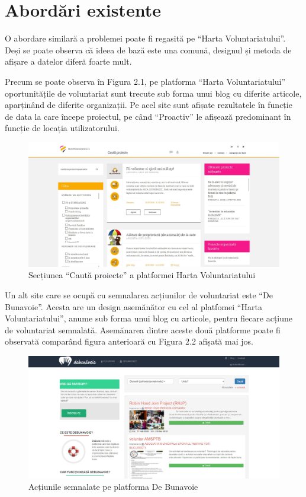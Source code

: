 \documentclass[12pt,a4paper]{report}
\begin{document}
\chapter{Abordări existente}
\par
O abordare similară a problemei poate fi regasită pe “Harta Voluntariatului”\cite{hv}. Deși se poate observa că ideea de bază este una comună, designul și metoda de afișare a datelor diferă foarte mult. 
\\ \par
Precum se poate observa în Figura 2.1, pe platforma “Harta Voluntariatului” oportunitățile de voluntariat sunt trecute sub forma unui blog cu diferite articole, aparținând de diferite organizații. Pe acel site sunt afișate rezultatele în funcție de data la care începe proiectul, pe când “Proactiv” le afișează predominant în funcție de locația utilizatorului.
\begin{figure}[H]
\centering
  \includegraphics[width=1\linewidth]{./imagini/hv1.jpg}
  \caption{Secțiunea “Caută proiecte” a platformei Harta Voluntariatului}
\end{figure}

\newpage
Un alt site care se ocupă cu semnalarea acțiunilor de voluntariat este “De Bunavoie”\cite{dbv}. Acesta are un design asemănător cu cel al platfomei “Harta Voluntariatului”, anume sub forma unui blog cu articole, pentru fiecare acțiune de voluntariat semnalată. Asemănarea dintre aceste două platforme poate fi observată comparând figura anterioară cu Figura 2.2 afișată mai jos.
\begin{figure}[H]
\centering
  \includegraphics[width=1\linewidth]{./imagini/dbv1.jpg}
  \caption{Acțiunile semnalate pe platforma De Bunavoie}
\end{figure}
\end{document}
